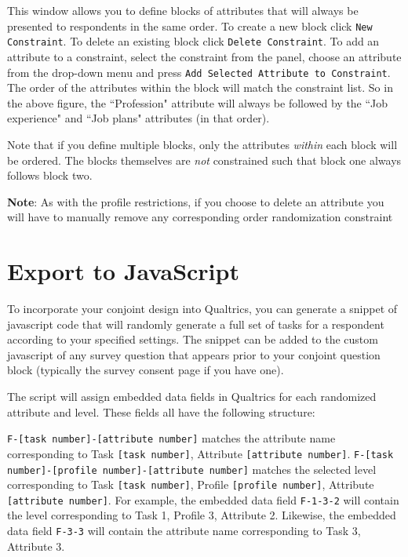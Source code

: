 \documentclass[12pt]{article}
\begin{document}
This window allows you to define blocks of attributes that will always be presented to respondents in the same order. To create a new block click \texttt{New Constraint}. To delete an existing block click \texttt{Delete Constraint}. To add an attribute to a constraint, select the constraint from the panel, choose an attribute from the drop-down menu and press \texttt{Add Selected Attribute to Constraint}. The order of the attributes within the block will match the constraint list. So in the above figure, the ``Profession" attribute will always be followed by the ``Job experience" and ``Job plans" attributes (in that order). 

Note that if you define multiple blocks, only the attributes \textit{within} each block will be ordered. The blocks themselves are \textit{not} constrained such that block one always follows block two.

\textbf{Note}: As with the profile restrictions, if you choose to delete an attribute you will have to manually remove any corresponding order randomization constraint 

\section{Export to JavaScript}

To incorporate your conjoint design into Qualtrics, you can generate a snippet of javascript code that will randomly generate a full set of tasks for a respondent according to your specified settings. The snippet can be added to the custom javascript of any survey question that appears prior to your conjoint question block (typically the survey consent page if you have one).

The script will assign embedded data fields in Qualtrics for each randomized attribute and level. These fields all have the following structure: 

\texttt{F-[task number]-[attribute number]} matches the attribute name corresponding to Task \texttt{[task number]}, Attribute \texttt{[attribute number]}. \texttt{F-[task number]-[profile number]-[attribute number]} matches the selected level corresponding to Task \texttt{[task number]}, Profile \texttt{[profile number]}, Attribute \texttt{[attribute number]}. For example, the embedded data field \texttt{F-1-3-2} will contain the level corresponding to Task 1, Profile 3, Attribute 2. Likewise, the embedded data field \texttt{F-3-3} will contain the attribute name corresponding to Task 3, Attribute 3.
\end{document}
